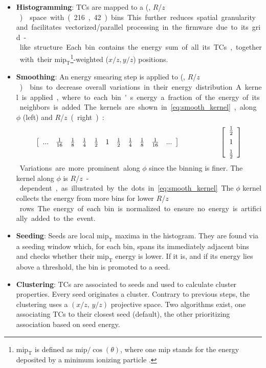 \documentclass[11pt]{article}
\newcommand{\azimuth}{$\phi$}
\newcommand{\coordsa}{(\si{\azi}, \si{\rz})}
\newcommand{\rz}{$R$/$z$}
\newcommand{\tmip}{$\text{mip}_{\text{T}}$}
\begin{document}
\begin{itemize}
\item \textbf{Histogramming}:
TCs are mapped to a \coordsa{} space with (216, 42) bins.
This further reduces spatial granularity and facilitates vectorized/parallel processing in the firmware due to its grid-like structure.
Each bin contains the energy sum of all its \acp{TC}, together with their \tmip{}\footnote{\tmip{} is defined as \(\text{mip}/\cos(\theta)\), where one mip stands for the energy deposited by a minimum ionizing particle \cite[\S34.2.3]{PDG} .}-weighted (\(x/z, y/z\)) positions.

\item \textbf{Smoothing}:
An energy smearing step is applied to \coordsa{} bins to decrease overall variations in their energy distribution.
A kernel is applied, where to each bin's energy a fraction of the energy of its neighbors is added.
The kernels are shown in \cref{eq:smooth_kernel}, along \azimuth{} (left) and \si{\rz} (right):

\begin{equation}
\label{eq:smooth_kernel}
    \left[
      \renewcommand*{\arraystretch}{1.0}
      \begin{array}{ccccccccccc}
        ...&\frac{1}{16}&\frac{1}{8}&\frac{1}{4}&\frac{1}{2}&1&\frac{1}{2}&\frac{1}{4}&\frac{1}{8}&\frac{1}{16}&...
      \end{array}
    \right]
    \hspace{2cm}
    \left[
      \renewcommand*{\arraystretch}{1.0}
      \begin{array}{c}
        \frac{1}{2} \\[.15cm]
        1 \\[.15cm]
        \frac{1}{2} \\
      \end{array}
    \right]
\end{equation}

Variations are more prominent along \azimuth{} since the binning is finer.
The kernel along \azimuth{} is \si{\rz}-dependent, as illustrated by the dots in \cref{eq:smooth_kernel}.
The \azimuth{} kernel collects the energy from more bins for lower \si{\rz} rows.
The energy of each bin is normalized to ensure no energy is artificially added to the event.

\item \textbf{Seeding}:
Seeds are local \tmip{} maxima in the histogram.
They are found via a seeding window which, for each bin, spans its immediately adjacent bins and checks whether their \tmip{} energy is lower.
If it is, and if its energy lies above a threshold, the bin is promoted to a seed.

\item \textbf{Clustering}:
\acp{TC} are associated to seeds and used to calculate cluster properties.
Every seed originates a cluster.
Contrary to previous steps, the clustering uses a \((x/z,\,y/z)\) projective space.
Two algorithms exist, one associating \acp{TC} to their closest seed (default), the other prioritizing association based on seed energy.
\end{itemize}
\end{document}

